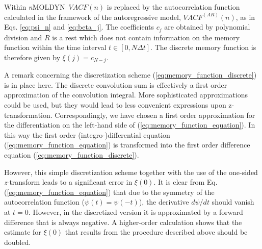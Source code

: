 \documentclass[a4paper,11pt]{report}
\newcommand{\NMOLDYN}{\textit{n}MOLDYN}
\begin{document}
Within \NMOLDYN\ $VACF(n)$ is replaced by the autocorrelation function calculated in the framework of the autoregressive model, 
$VACF^{(AR)}(n)$, as in Eqs. \ref{eq:psi_n} and \ref{eq:beta_j}. The coefficients $c_j$ are obtained by polynomial division and 
$R$ is a rest which does not contain information on the memory function within the time interval $t\in [0,N\Delta t]$. The discrete 
memory function is therefore given by $\xi(j) = c_{N-j}$.

A remark concerning the discretization scheme (\ref{eq:memory_function_discrete}) is in place here. The discrete convolution 
sum is effectively a first order approximation of the convolution integral. More sophisticated approximations could be used,
but they would lead to less convenient expressions upon z-transformation. Correspondingly, we have chosen a first order 
approximation for the differentiation on the left-hand side of (\ref{eq:memory_function_equation}). In this way the first order 
(integro-)differential equation (\ref{eq:memory_function_equation}) is transformed into the first order difference equation 
(\ref{eq:memory_function_discrete}).

However, this simple discretization scheme together with the use of the one-sided \textit{z}-transform leads to a significant 
error in $\xi(0)$. It is clear from Eq. (\ref{eq:memory_function_equation}) that due to the symmetry of the autocorrelation function 
($\psi(t)=\psi(-t)$), the derivative $d\psi/dt$ should vanish at $t=0.$ However, in the discretized version it is 
approximated by a forward difference that is always negative. A higher-order calculation shows that the estimate for 
$\xi(0)$ that results from the procedure described above should be doubled.
\end{document}

